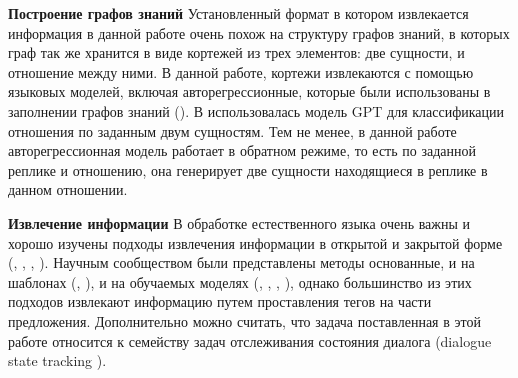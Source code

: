 \textbf{Построение графов знаний}   Установленный формат в котором извлекается информация в данной работе очень похож на структуру графов знаний, в которых граф так же хранится в виде кортежей из трех элементов: две сущности, и отношение между ними. В данной работе, кортежи извлекаются с помощью языковых моделей, включая авторегрессионные, которые были использованы в заполнении графов знаний (\cite{bosselut-etal-2019-comet}). В \cite{alt2019improving} использовалась модель GPT \cite{gpt2} для классификации отношения по заданным двум сущностям. Тем не менее, в данной работе авторегрессионная модель работает в обратном режиме, то есть по заданной реплике и отношению, она генерирует две сущности находящиеся в реплике в данном отношении.

\textbf{Извлечение информации}  В обработке естественного языка очень важны и хорошо изучены подходы извлечения информации в открытой и закрытой форме (\cite{banko2007}, \cite{wu-weld-2010-open}, \cite{berant-etal-2011-global}, \cite{fader2014}). Научным сообществом были представлены методы основанные, и на шаблонах (\cite{mausam-etal-2012-open}, \cite{delcorro2013}), и на обучаемых моделях (\cite{zeng-etal-2014-relation}, \cite{xu-etal-2015-classifying}, \cite{stanovsky-etal-2018-supervised}, \cite{vashishth-etal-2018-reside}), однако большинство из этих подходов извлекают информацию путем проставления тегов на части предложения. Дополнительно можно считать, что задача поставленная в этой работе относится к семейству задач отслеживания состояния диалога (dialogue state tracking \cite{dstc_survey}).

